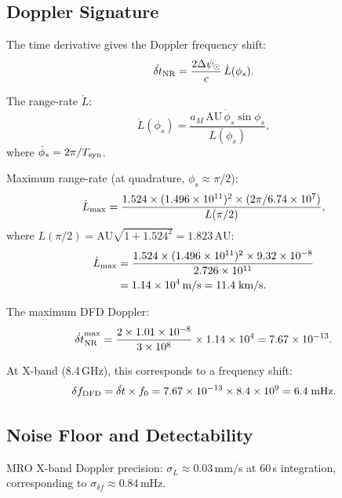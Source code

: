 \documentclass[aps,prd,twocolumn,superscriptaddress]{revtex4-2}
\begin{document}
\subsection{Doppler Signature}

The time derivative gives the Doppler frequency shift:
\begin{equation}
\dot{\delta t}_{\rm NR} = \frac{2\Delta\psi_\odot}{c}\,\dot{L}(\phi_s).
\end{equation}

The range-rate $\dot{L}$:
\begin{equation}
\dot{L}(\phi_s) = \frac{a_M\,\text{AU}\,\dot{\phi}_s\sin\phi_s}{L(\phi_s)},
\end{equation}
where $\dot{\phi}_s = 2\pi/T_{\rm syn}$.

Maximum range-rate (at quadrature, $\phi_s \approx \pi/2$):
\begin{equation}
\dot{L}_{\rm max} = \frac{1.524\times(1.496\times10^{11})^2
\times(2\pi/6.74\times10^7)}{L(\pi/2)},
\end{equation}
where $L(\pi/2) = \text{AU}\sqrt{1 + 1.524^2} = 1.823\,\text{AU}$:
\begin{align}
\dot{L}_{\rm max} &= \frac{1.524\times(1.496\times10^{11})^2\times9.32\times10^{-8}}
{2.726\times10^{11}}
\nonumber\\
&= 1.14\times10^{4}\,\text{m/s} = 11.4\;\text{km/s}.
\end{align}

The maximum DFD Doppler:
\begin{equation}
\dot{\delta t}_{\rm NR}^{\rm max} = \frac{2\times1.01\times10^{-8}}{3\times10^8}
\times1.14\times10^4 = 7.67\times10^{-13}.
\end{equation}

At X-band (8.4\,GHz), this corresponds to a frequency shift:
\begin{equation}
\delta f_{\rm DFD} = \dot{\delta t}\times f_0
= 7.67\times10^{-13}\times8.4\times10^9 = 6.4\;\text{mHz}.
\end{equation}

\subsection{Noise Floor and Detectability}

MRO X-band Doppler precision: $\sigma_{\dot{L}} \approx 0.03$\,mm/s
at 60\,s integration, corresponding to $\sigma_{\delta f} \approx 0.84$\,mHz.
\end{document}
